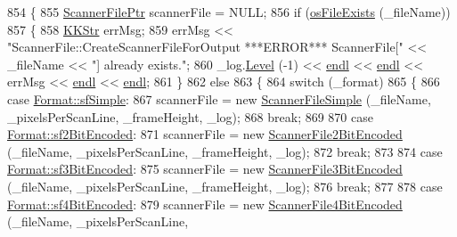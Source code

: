 \begin{DoxyCode}
854 \{
855   \hyperlink{class_k_k_l_s_c_1_1_scanner_file}{ScannerFilePtr}  scannerFile = NULL;
856   \textcolor{keywordflow}{if}  (\hyperlink{namespace_k_k_b_aba5c7fcb492dea01f2115c492ff65d83}{osFileExists} (\_fileName))
857   \{
858     \hyperlink{class_k_k_b_1_1_k_k_str}{KKStr}  errMsg;
859     errMsg << \textcolor{stringliteral}{"ScannerFile::CreateScannerFileForOutput   ***ERROR***   ScannerFile["} << \_fileName << \textcolor{stringliteral}{"] 
       already exists."};
860     \_log.\hyperlink{class_k_k_b_1_1_run_log_a32cf761d7f2e747465fd80533fdbb659}{Level} (-1) << \hyperlink{namespace_k_k_b_ad1f50f65af6adc8fa9e6f62d007818a8}{endl} << \hyperlink{namespace_k_k_b_ad1f50f65af6adc8fa9e6f62d007818a8}{endl} << errMsg << \hyperlink{namespace_k_k_b_ad1f50f65af6adc8fa9e6f62d007818a8}{endl} << \hyperlink{namespace_k_k_b_ad1f50f65af6adc8fa9e6f62d007818a8}{endl};
861   \}
862   \textcolor{keywordflow}{else}
863   \{
864     \textcolor{keywordflow}{switch}  (\_format)
865     \{
866     \textcolor{keywordflow}{case}  \hyperlink{class_k_k_l_s_c_1_1_scanner_file_a9eb976c9d084a94db71a5e8d1fadb903a7230911a32d0f83589b687452a05523f}{Format::sfSimple}:      
867       scannerFile = \textcolor{keyword}{new} \hyperlink{class_k_k_l_s_c_1_1_scanner_file_simple}{ScannerFileSimple} (\_fileName, \_pixelsPerScanLine, \_frameHeight, 
      \_log);
868       \textcolor{keywordflow}{break};
869 
870     \textcolor{keywordflow}{case}  \hyperlink{class_k_k_l_s_c_1_1_scanner_file_a9eb976c9d084a94db71a5e8d1fadb903af3095a7a2ca6c23dfd11942c41a35d66}{Format::sf2BitEncoded}:
871       scannerFile = \textcolor{keyword}{new} \hyperlink{class_k_k_l_s_c_1_1_scanner_file2_bit_encoded}{ScannerFile2BitEncoded} (\_fileName, \_pixelsPerScanLine, 
      \_frameHeight, \_log);
872       \textcolor{keywordflow}{break};
873 
874     \textcolor{keywordflow}{case}  \hyperlink{class_k_k_l_s_c_1_1_scanner_file_a9eb976c9d084a94db71a5e8d1fadb903a2a9330d778623273c413369a5f990849}{Format::sf3BitEncoded}:
875       scannerFile = \textcolor{keyword}{new} \hyperlink{class_k_k_l_s_c_1_1_scanner_file3_bit_encoded}{ScannerFile3BitEncoded} (\_fileName, \_pixelsPerScanLine, 
      \_frameHeight, \_log);
876       \textcolor{keywordflow}{break};
877 
878     \textcolor{keywordflow}{case}  \hyperlink{class_k_k_l_s_c_1_1_scanner_file_a9eb976c9d084a94db71a5e8d1fadb903a624af7c88dcebdb27a791b18a6283325}{Format::sf4BitEncoded}:
879       scannerFile = \textcolor{keyword}{new} \hyperlink{class_k_k_l_s_c_1_1_scanner_file4_bit_encoded}{ScannerFile4BitEncoded} (\_fileName, \_pixelsPerScanLine, 

\end{DoxyCode}

